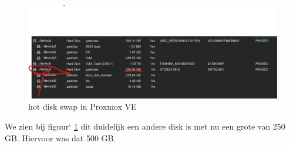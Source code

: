 \begin{figure}[H]
  \centering
  \includegraphics[width=1.2\textwidth]{../poc/hot-disktwee-prox.png}
  \caption{hot disk swap in Proxmox VE}
  \label{fig:hotdiskvervangen-swap}
\end{figure}

We zien bij figuur` \ref{fig:hotdiskvervangen-swap} dit duidelijk een andere disk is met nu een grote van 250 GB. Hiervoor was dat 500 GB.